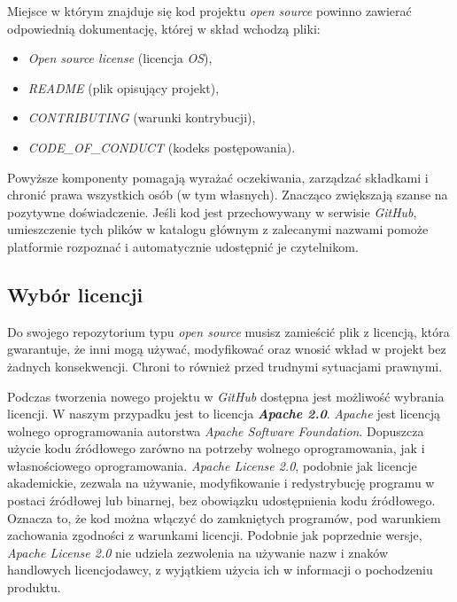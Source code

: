 \documentclass{article}
\begin{document}
\hspace{4mm} Miejsce w którym znajduje się kod projektu \emph{open source} powinno zawierać odpowiednią dokumentację, której w skład wchodzą pliki:
\begin{itemize}
    \item \emph{Open source license} (licencja \emph{OS}),
    \item \emph{README} (plik opisujący projekt),
    \item \emph{CONTRIBUTING} (warunki kontrybucji),
    \item \emph{CODE\_OF\_CONDUCT} (kodeks postępowania).
\end{itemize}
Powyższe komponenty pomagają wyrażać oczekiwania, zarządzać składkami i chronić prawa wszystkich osób (w tym własnych). Znacząco zwiększają szanse na pozytywne doświadczenie. Jeśli kod jest przechowywany w serwisie \emph{GitHub}, umieszczenie tych plików w katalogu głównym z zalecanymi nazwami pomoże platformie rozpoznać i automatycznie udostępnić je czytelnikom\cite{opensource.guide}.

\subsection{Wybór licencji}

\hspace{4mm} Do swojego repozytorium typu \emph{open source} musisz zamieścić plik z licencją, która gwarantuje, że inni mogą używać, modyfikować oraz wnosić wkład w projekt bez żadnych konsekwencji. Chroni to również przed trudnymi sytuacjami prawnymi\cite{opensource.guide}. 

Podczas tworzenia nowego projektu w \emph{GitHub} dostępna jest możliwość wybrania licencji. W naszym przypadku jest to licencja \textbf{\emph{Apache 2.0}}. \emph{Apache} jest licencją wolnego oprogramowania autorstwa \emph{Apache Software Foundation}. Dopuszcza użycie kodu źródłowego zarówno na potrzeby wolnego oprogramowania, jak i własnościowego oprogramowania. \emph{Apache License 2.0}, podobnie jak licencje akademickie, zezwala na używanie, modyfikowanie i redystrybucję programu w postaci źródłowej lub binarnej, bez obowiązku udostępnienia kodu źródłowego. Oznacza to, że kod można włączyć do zamkniętych programów, pod warunkiem zachowania zgodności z warunkami licencji. Podobnie jak poprzednie wersje, \emph{Apache License 2.0} nie udziela zezwolenia na używanie nazw i znaków handlowych licencjodawcy, z wyjątkiem użycia ich w informacji o pochodzeniu produktu\cite{apache}.
\end{document}

